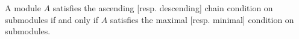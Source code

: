 A module \(A\) satisfies the ascending [resp. descending] chain condition on submodules if and only if \(A\) satisfies the maximal [resp. minimal] condition on submodules.
